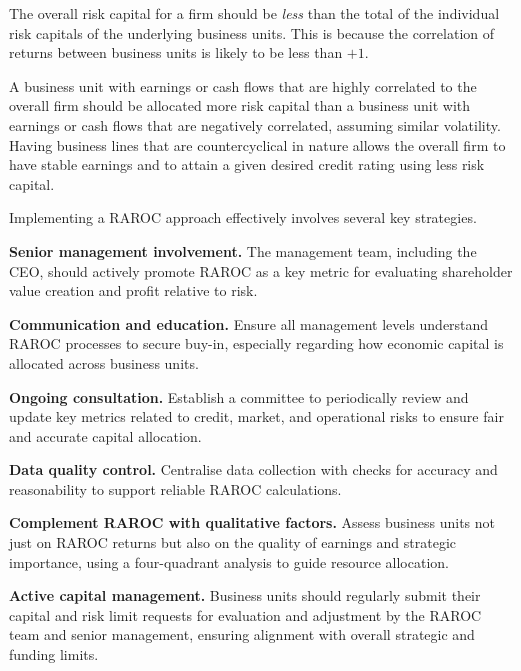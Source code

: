 
\begin{orkeybox}
The overall risk capital for a firm should be \emph{less} than the total of the
individual risk capitals of the underlying business units. This is because the
correlation of returns between business units is likely to be less than $+1$.
\end{orkeybox}

A business unit with earnings or cash flows that are highly correlated to the
overall firm should be allocated more risk capital than a business unit with
earnings or cash flows that are negatively correlated, assuming similar
volatility. Having business lines that are countercyclical in nature allows the
overall firm to have stable earnings and to attain a given desired credit rating
using less risk capital.



Implementing a RAROC approach effectively involves several key strategies.

\begin{lettered}
\item \textbf{Senior management involvement.} The management team, including the
CEO, should actively promote RAROC as a key metric for evaluating shareholder value
creation and profit relative to risk.
\item \textbf{Communication and education.} Ensure all management levels
understand RAROC processes to secure buy-in, especially regarding how economic
capital is allocated across business units.
\item \textbf{Ongoing consultation.} Establish a committee to periodically review
and update key metrics related to credit, market, and operational risks to ensure
fair and accurate capital allocation.
\item \textbf{Data quality control.} Centralise data collection with checks for
accuracy and reasonability to support reliable RAROC calculations.
\item \textbf{Complement RAROC with qualitative factors.} Assess business units not
just on RAROC returns but also on the quality of earnings and strategic importance,
using a four-quadrant analysis to guide resource allocation.
\item \textbf{Active capital management.} Business units should regularly submit
their capital and risk limit requests for evaluation and adjustment by the RAROC
team and senior management, ensuring alignment with overall strategic and funding
limits.
\end{lettered}
